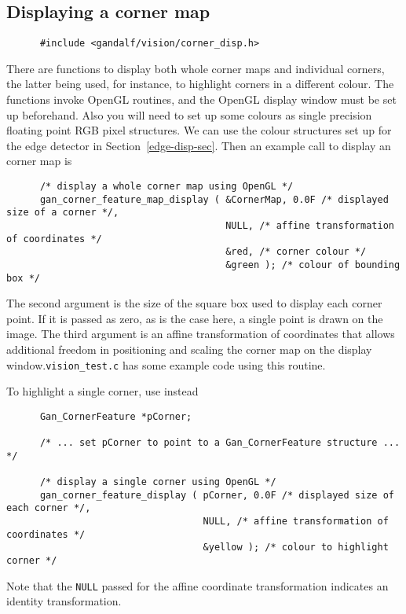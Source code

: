 \subsection{Displaying a corner map}
\begin{verbatim}
      #include <gandalf/vision/corner_disp.h>
\end{verbatim}
There are functions to display both whole corner maps and individual corners,
the latter being used, for instance, to highlight corners in a different
colour. The functions invoke OpenGL routines, and the OpenGL display window
must be set up beforehand. Also you will need to set up some colours as single
precision floating point RGB pixel structures. We can use the colour
structures set up for the edge detector in Section~\ref{edge-disp-sec}.
Then an example call to display an corner map is
\begin{verbatim}
      /* display a whole corner map using OpenGL */
      gan_corner_feature_map_display ( &CornerMap, 0.0F /* displayed size of a corner */,
                                       NULL, /* affine transformation of coordinates */
                                       &red, /* corner colour */
                                       &green ); /* colour of bounding box */
\end{verbatim}
The second argument is the size of the square box used to display each
corner point. If it is passed as zero, as is the case here, a single point is
drawn on the image. The third argument is an affine transformation
of coordinates that allows additional freedom in positioning and scaling
the corner map on the display window.{\tt vision\_test.c} has some example code
using this routine.

To highlight a single corner, use instead
\begin{verbatim}
      Gan_CornerFeature *pCorner;

      /* ... set pCorner to point to a Gan_CornerFeature structure ... */

      /* display a single corner using OpenGL */
      gan_corner_feature_display ( pCorner, 0.0F /* displayed size of each corner */,
                                   NULL, /* affine transformation of coordinates */
                                   &yellow ); /* colour to highlight corner */
\end{verbatim}
Note that the {\tt NULL} passed for the affine coordinate transformation
indicates an identity transformation.

